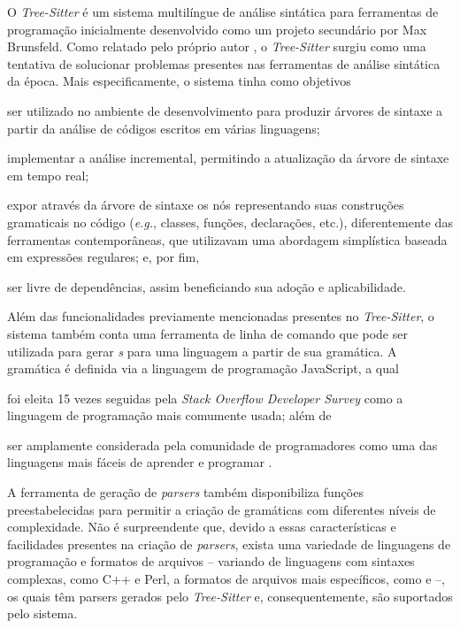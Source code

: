 \documentclass
  [11pt, a4paper, english, openright, sumario = tradicional, twoside, brazil]
  {abntex2}
\begin{document}
  O \textit{Tree-Sitter} é um sistema multilíngue de análise sintática para
  ferramentas de programação inicialmente desenvolvido como um projeto
  secundário por Max Brunsfeld. Como relatado pelo próprio autor
  \cite{github-2017-tree}, o \textit{Tree-Sitter} surgiu como uma tentativa de
  solucionar problemas presentes nas ferramentas de análise sintática da época.
  Mais especificamente, o sistema tinha como objetivos
  \begin{inparaenum}
    \item ser utilizado no ambiente de desenvolvimento para produzir árvores de
          sintaxe a partir da análise de códigos escritos em várias linguagens;
    \item implementar a análise incremental, permitindo a atualização da árvore
          de sintaxe em tempo real;
    \item expor através da árvore de sintaxe os nós representando suas
          construções gramaticais no código (\textit{e.g.}, classes, funções,
          declarações, etc.), diferentemente das ferramentas contemporâneas,
          que utilizavam uma abordagem simplística baseada em expressões
          regulares; e, por fim,
    \item ser livre de dependências, assim beneficiando sua adoção e
          aplicabilidade.
  \end{inparaenum}

  Além das funcionalidades previamente mencionadas presentes no
  \textit{Tree-Sitter}, o sistema também conta uma ferramenta de linha de
  comando que pode ser utilizada para gerar \textit{s} para uma
  linguagem a partir de sua gramática. A gramática é definida via a linguagem
  de programação JavaScript, a qual
  \begin{inparaenum}
    \item foi eleita 15 vezes seguidas pela
          \textit{Stack Overflow Developer Survey}
          \cite{stack-overflow-2022-stack} como a linguagem de programação mais
          comumente usada; além de
    \item ser amplamente considerada pela comunidade de programadores
          como uma das linguagens mais fáceis de aprender e programar
          \cites{berkeley-2023-11}{goel-2023-how}{w3schools-2023-javascript}.
  \end{inparaenum}
  A ferramenta de geração de \textit{parsers} também disponibiliza funções
  preestabelecidas para permitir a criação de gramáticas com diferentes níveis
  de complexidade. Não é surpreendente que, devido a essas características e
  facilidades presentes na criação de \textit{parsers}, exista uma variedade de
  linguagens de programação e formatos de arquivos -- variando de linguagens
  com sintaxes complexas, como C++ e Perl, a formatos de arquivos mais
  específicos, como  e  --, os quais
  têm parsers gerados pelo \textit{Tree-Sitter} e, consequentemente, são
  suportados pelo sistema.
\end{document}

